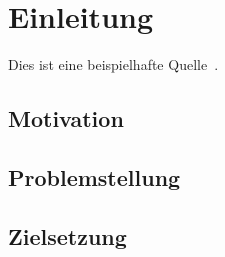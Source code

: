 \clearpage

\section{Einleitung}
Dies ist eine beispielhafte Quelle~\cite{example2024}.

\subsection{Motivation}

\subsection{Problemstellung}


\subsection{Zielsetzung}



